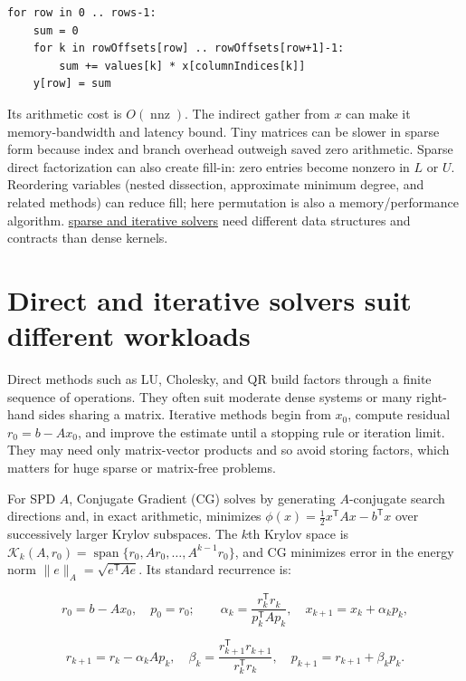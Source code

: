 \begin{verbatim}
for row in 0 .. rows-1:
    sum = 0
    for k in rowOffsets[row] .. rowOffsets[row+1]-1:
        sum += values[k] * x[columnIndices[k]]
    y[row] = sum
\end{verbatim}

Its arithmetic cost is \(O(\operatorname{nnz})\). The indirect gather from \(x\) can make it memory-bandwidth and latency bound. Tiny matrices can be slower in sparse form because index and branch overhead outweigh saved zero arithmetic. Sparse direct factorization can also create fill-in: zero entries become nonzero in \(L\) or \(U\). Reordering variables (nested dissection, approximate minimum degree, and related methods) can reduce fill; here permutation is also a memory/performance algorithm. \hyperref[02-foundations-ii-ch038-sparse-storage-changes-the-cost-model]{sparse and iterative solvers} need different data structures and contracts than dense kernels.

\section{Direct and iterative solvers suit different workloads}\label{02-foundations-ii-ch038-direct-and-iterative-solvers-suit-different-workloads}

Direct methods such as LU, Cholesky, and QR build factors through a finite sequence of operations. They often suit moderate dense systems or many right-hand sides sharing a matrix. Iterative methods begin from \(x_0\), compute residual \(r_0=b-Ax_0\), and improve the estimate until a stopping rule or iteration limit. They may need only matrix-vector products and so avoid storing factors, which matters for huge sparse or matrix-free problems.

For SPD \(A\), Conjugate Gradient (CG) solves by generating \(A\)-conjugate search directions and, in exact arithmetic, minimizes \(\phi(x)=\tfrac12x^\mathsf TAx-b^\mathsf Tx\) over successively larger Krylov subspaces. The \(k\)th Krylov space is \(\mathcal K_k(A,r_0)=\operatorname{span}\{r_0,Ar_0,\ldots,A^{k-1}r_0\}\), and CG minimizes error in the energy norm \(\|e\|_A=\sqrt{e^\mathsf TAe}\). Its standard recurrence is:

\[
r_0=b-Ax_0,\quad p_0=r_0;
\qquad \alpha_k=\frac{r_k^\mathsf Tr_k}{p_k^\mathsf TAp_k},\quad
x_{k+1}=x_k+\alpha_kp_k,
\]

\[
r_{k+1}=r_k-\alpha_kAp_k,\quad
\beta_k=\frac{r_{k+1}^\mathsf Tr_{k+1}}{r_k^\mathsf Tr_k},\quad
p_{k+1}=r_{k+1}+\beta_kp_k.
\]

